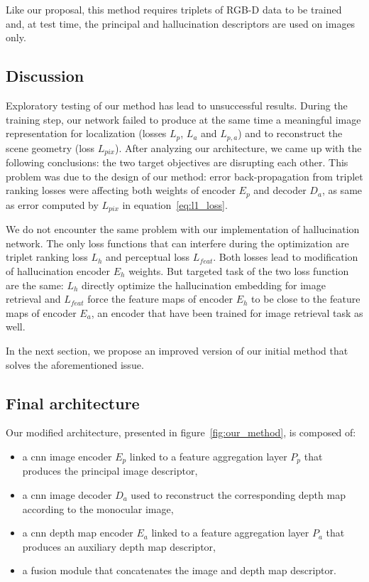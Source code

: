 Like our proposal, this method requires triplets of RGB-D data to be trained and, at test time, the principal and hallucination descriptors are used on images only.

\subsection{Discussion}
\label{subsec:discussion}
Exploratory testing of our method has lead to unsuccessful results. During the training step, our network failed to produce at the same time a meaningful image representation for localization (losses $L_p$, $L_a$ and $L_{p,a}$) and to reconstruct the scene geometry (loss $L_{pix}$). After analyzing our architecture, we came up with the following conclusions: the two target objectives are disrupting each other. This problem was due to the design of our method: error back-propagation from triplet ranking losses were affecting both weights of encoder $E_p$ and decoder $D_a$, as same as error computed by $L_{pix}$ in equation~\ref{eq:l1_loss}. 

We do not encounter the same problem with our implementation of hallucination network. The only loss functions that can interfere during the optimization are triplet ranking loss $L_h$ and perceptual loss $L_{feat}$. Both losses lead to modification of hallucination encoder $E_h$ weights. But targeted task of the two loss function are the same: $L_h$ directly optimize the hallucination embedding for image retrieval and $L_{feat}$ force the feature maps of encoder $E_h$ to be close to the feature maps of encoder $E_a$, an encoder that have been trained for image retrieval task as well.

In the next section, we propose an improved version of our initial method that solves the aforementioned issue.

\subsection{Final architecture}

Our modified architecture, presented in figure~\ref{fig:our_method}, is composed of:

\begin{itemize}
	\item a \ac{cnn} image encoder $E_p$ linked to a feature aggregation layer $P_p$ that produces the principal image descriptor,
	\item a \ac{cnn} image decoder $D_a$ used to reconstruct the corresponding depth map according to the monocular image,
	\item a \ac{cnn} depth map encoder $E_a$ linked to a feature aggregation layer $P_a$ that produces an auxiliary depth map descriptor,
	\item a fusion module that concatenates the image and depth map descriptor.
\end{itemize}

